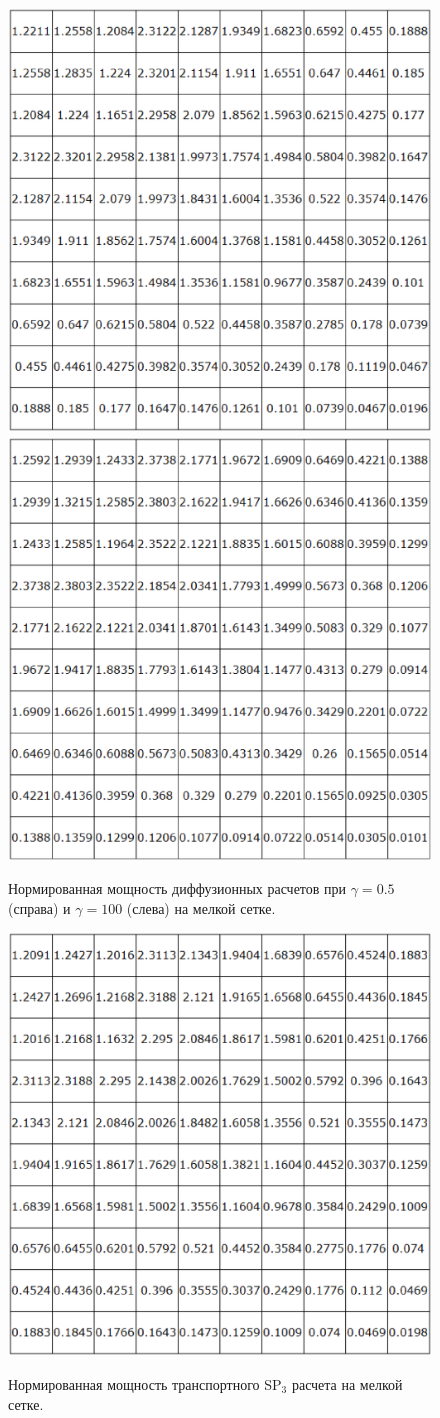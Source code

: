 \documentclass{crm-article}
\begin{document}
\begin{figure}[ht]
\begin{center}
	\includegraphics[width=0.4\linewidth]{dif_pwr.eps} \hspace{20pt}
	\includegraphics[width=0.4\linewidth]{dif_pwr_100.eps}\\
	\caption{\label{image:canonsummary} Нормированная мощность диффузионных расчетов при $\gamma=0.5$ (справа) и $\gamma=100$ (слева) на мелкой сетке.}
	\label{ris:dif_pwr}
\end{center}
\end{figure}

\begin{figure}[ht]
\begin{center}
	\includegraphics[width=0.4\linewidth]{sp3_pwr.eps}\\
	\caption{\label{image:canonsummary} Нормированная мощность транспортного SP$_3$ расчета на мелкой сетке.}
	\label{ris:sp3_pwr}
\end{center}
\end{figure}
\end{document}
